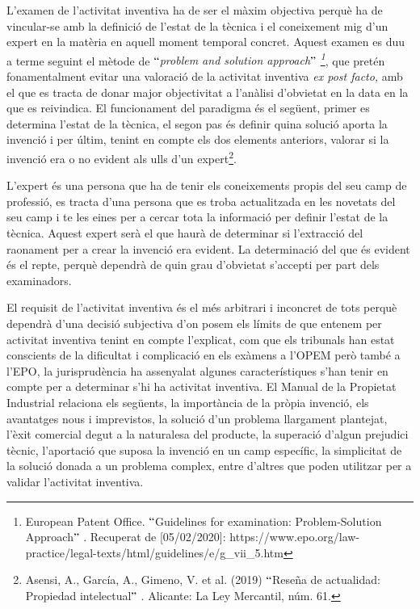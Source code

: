 \documentclass[12pt]{article}
\begin{document}
\begin{enumerate}
\vspace{\baselineskip}
L’examen de l’activitat inventiva ha de ser el màxim objectiva perquè ha de vincular-se amb la definició de l’estat de la tècnica i el coneixement mig d’un expert en la matèria en aquell moment temporal concret. Aquest examen es duu a terme seguint el mètode de $``$\textit{problem and solution approach$"$ \footnote{ European Patent Office. $``$Guidelines for examination: Problem-Solution Approach$"$ . Recuperat de [05/02/2020]: https://www.epo.org/law-practice/legal-texts/html/guidelines/e/g\_vii\_5.htm }}, que pretén fonamentalment evitar una valoració de la activitat inventiva \textit{ex post facto, }amb el que es tracta de donar major objectivitat a l’anàlisi d’obvietat en la data en la que es reivindica. El funcionament del paradigma és el següent, primer es determina l’estat de la tècnica, el segon pas és definir quina solució aporta la invenció i per últim, tenint en compte els dos elements anteriors, valorar si la invenció era o no evident als ulls d’un expert\footnote{ Asensi, A., García, A., Gimeno, V. et al. (2019) $``$Reseña de actualidad: Propiedad intelectual$"$ . Alicante: La Ley Mercantil, núm. 61.  }. \par


\vspace{\baselineskip}
L’expert és una persona que ha de tenir els coneixements propis del seu camp de professió, es tracta d’una persona que es troba actualitzada en les novetats del seu camp i te les eines per a cercar tota la informació per definir l’estat de la tècnica. Aquest expert serà el que haurà de determinar si l’extracció del raonament per a crear la invenció era evident. La determinació del que és evident és el repte, perquè dependrà de quin grau d’obvietat s’accepti per part dels examinadors. \par


\vspace{\baselineskip}
El requisit de l’activitat inventiva és el més arbitrari i inconcret de tots perquè dependrà d’una decisió subjectiva d’on posem els límits de que entenem per activitat inventiva tenint en compte l’explicat, com que els tribunals han estat conscients de la dificultat i complicació en els exàmens a l’OPEM però també a l’EPO, la jurisprudència ha assenyalat algunes característiques s’han tenir en compte per a determinar s’hi ha activitat inventiva. El Manual de la Propietat Industrial relaciona els següents,  la importància de la pròpia invenció, els avantatges nous  i imprevistos, la solució d’un problema llargament plantejat, l’èxit comercial degut a la naturalesa del producte, la superació d’algun prejudici tècnic, l’aportació que suposa la invenció en un camp específic, la simplicitat de la solució donada a un problema complex, entre d’altres que poden utilitzar per a validar l’activitat inventiva. \par



\end{enumerate}
\end{document}
